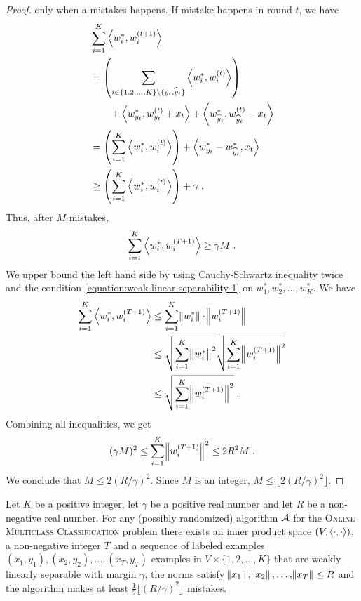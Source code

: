 \begin{proof}
only when a mistakes happens. If mistake happens in round $t$, we have
\begin{align*}
& \sum_{i=1}^K \left\langle w_i^*, w_i^{(t+1)} \right\rangle \\
& = \left( \sum_{i \in \{1,2,\dots,K\} \setminus \{y_t, \widehat y_t\}} \left\langle w_i^*, w_i^{(t)} \right\rangle \right) \\
& \qquad + \left\langle w_{y_t}^*, w_{y_t}^{(t)} + x_t \right\rangle + \left\langle w_{\widehat y_t}^*, w_{\widehat y_t}^{(t)} - x_t \right\rangle \\
& = \left( \sum_{i=1}^K \left\langle w_i^*, w_i^{(t)} \right\rangle \right) + \left\langle w_{y_t}^* - w_{\widehat y_t}^*, x_t \right\rangle \\
& \ge  \left( \sum_{i=1}^K \left\langle w_i^*, w_i^{(t)} \right\rangle \right) + \gamma \; .
\end{align*}
Thus, after $M$ mistakes,
$$
\sum_{i=1}^K \left\langle w_i^*, w_i^{(T+1)} \right\rangle \ge \gamma M \; .
$$
We upper bound the left hand side by using Cauchy-Schwartz inequality twice and
the condition \eqref{equation:weak-linear-separability-1} on $w_1^*, w_2^*, \dots,
w_K^*$. We have
\begin{align*}
\sum_{i=1}^K \left\langle w_i^*, w_i^{(T+1)} \right\rangle
& \le \sum_{i=1}^K \norm{w_i^*} \cdot \norm{w_i^{(T+1)}} \\
& \le \sqrt{\sum_{i=1}^K \norm{w_i^*}^2} \sqrt{\sum_{i=1}^K \norm{w_i^{(T+1)}}^2} \\
& \le \sqrt{\sum_{i=1}^K \norm{w_i^{(T+1)}}^2} \; .
\end{align*}
Combining all inequalities, we get
$$
(\gamma M)^2 \le \sum_{i=1}^K \norm{w_i^{(T+1)}}^2 \le 2R^2 M \; .
$$
We conclude that $M \le 2(R/\gamma)^2$. Since $M$ is an integer, $M \le \lfloor 2(R/\gamma)^2 \rfloor$.
\end{proof}


\begin{theorem}
\label{theorem:online-multiclass-classification-mistake-lower-bound}
Let $K$ be a positive integer, let $\gamma$ be a positive real number and let
$R$ be a non-negative real number. For any (possibly randomized) algorithm
$\mathcal{A}$ for the
\textsc{Online Multiclass Classification} problem there exists an
inner product space $(V, \left\langle \cdot, \cdot \right\rangle)$, a non-negative integer $T$ and a
sequence of labeled examples $(x_1, y_1), (x_2, y_2), \dots, (x_T, y_T)$
examples in $V \times \{1,2,\dots,K\}$ that are weakly linearly separable with margin
$\gamma$, the norms satisfy $\norm{x_1}, \norm{x_2}, \dots, \norm{x_T} \le R$
and the algorithm makes at least $\frac 1 2 \lfloor (R/\gamma)^2 \rfloor$ mistakes.
\end{theorem}


